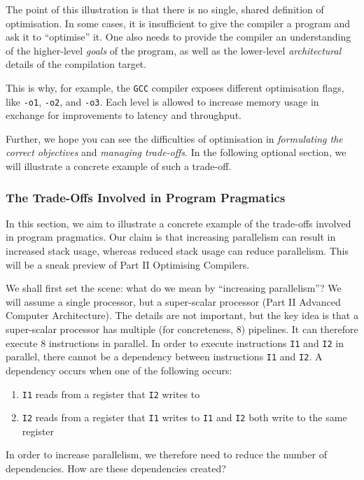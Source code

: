 The point of this illustration is that there is no single, shared definition of optimisation. In some cases, it is insufficient to give the compiler a program and ask it to ``optimise'' it. One also needs to provide the compiler an understanding of the higher-level \textit{goals} of the program, as well as the lower-level \textit{architectural} details of the compilation target.

This is why, for example, the \texttt{GCC} compiler exposes different optimisation flags, like \texttt{-o1}, \texttt{-o2}, and \texttt{-o3}. Each level is allowed to increase memory usage in exchange for improvements to latency and throughput. 

Further, we hope you can see the difficulties of optimisation in \textit{formulating the correct objectives} and \textit{managing trade-offs}. In the following optional section, we will illustrate a concrete example of such a trade-off. 

\subsubsection{The Trade-Offs Involved in Program Pragmatics\optional}
In this section, we aim to illustrate a concrete example of the trade-offs involved in program pragmatics. Our claim is that increasing parallelism can result in increased stack usage, whereas reduced stack usage can reduce parallelism. This will be a sneak preview of \textsf{Part II Optimising Compilers}. 

We shall first set the scene: what do we mean by ``increasing parallelism''? We will assume a single processor, but a super-scalar processor (\textsf{Part II Advanced Computer Architecture}). The details are not important, but the key idea is that a super-scalar processor has multiple (for concreteness, 8) pipelines. It can therefore execute 8 instructions in parallel. In order to execute instructions \texttt{I1} and \texttt{I2} in parallel, there cannot be a dependency between instructions \texttt{I1} and \texttt{I2}. A dependency occurs when one of the following occurs:
\begin{enumerate}
    \item \texttt{I1} reads from a register that \texttt{I2} writes to
    \item \texttt{I2} reads from a register that \texttt{I1} writes to
    \texttt{I1} and \texttt{I2} both write to the same register
\end{enumerate}
In order to increase parallelism, we therefore need to reduce the number of dependencies. How are these dependencies created?

